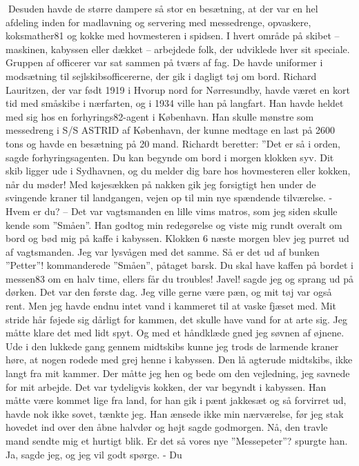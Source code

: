 Desuden havde de større dampere så stor en besætning, at der var en hel
afdeling inden for madlavning og servering med messedrenge, opvaskere,
koksmather81 og kokke med hovmesteren i spidsen. I hvert område på
skibet -- maskinen, kabyssen eller dækket -- arbejdede folk, der
udviklede hver sit speciale. Gruppen af officerer var sat sammen på
tværs af fag. De havde uniformer i modsætning til sejlskibsofficererne,
der gik i dagligt tøj om bord. Richard Lauritzen, der var født 1919 i
Hvorup nord for Nørresundby, havde været en kort tid med småskibe i
nærfarten, og i 1934 ville han på langfart. Han havde heldet med sig hos
en forhyrings82-agent i København. Han skulle mønstre som messedreng i
S/S ASTRID af København, der kunne medtage en last på 2600 tons og havde
en besætning på 20 mand. Richardt beretter: ''Det er så i orden, sagde
forhyringsagenten. Du kan begynde om bord i morgen klokken syv. Dit skib
ligger ude i Sydhavnen, og du melder dig bare hos hovmesteren eller
kokken, når du møder! Med køjesækken på nakken gik jeg forsigtigt hen
under de svingende kraner til landgangen, vejen op til min nye spændende
tilværelse. - Hvem er du? -- Det var vagtsmanden en lille vims matros,
som jeg siden skulle kende som ''Småen''. Han godtog min redegørelse og
viste mig rundt overalt om bord og bød mig på kaffe i kabyssen. Klokken
6 næste morgen blev jeg purret ud af vagtsmanden. Jeg var lysvågen med
det samme. Så er det ud af bunken ''Petter''! kommanderede ''Småen'',
påtaget barsk. Du skal have kaffen på bordet i messen83 om en halv time,
ellers får du troubles! Javel! sagde jeg og sprang ud på dørken. Det var
den første dag. Jeg ville gerne være pæn, og mit tøj var også rent. Men
jeg havde endnu intet vand i kammeret til at vaske fjæset med. Mit
stride hår føjede sig dårligt for kammen, det skulle have vand for at
arte sig. Jeg måtte klare det med lidt spyt. Og med et håndklæde gned
jeg søvnen af øjnene. Ude i den lukkede gang gennem midtskibs kunne jeg
trods de larmende kraner høre, at nogen rodede med grej henne i
kabyssen. Den lå agterude midtskibs, ikke langt fra mit kammer. Der
måtte jeg hen og bede om den vejledning, jeg savnede for mit arbejde.
Det var tydeligvis kokken, der var begyndt i kabyssen. Han måtte være
kommet lige fra land, for han gik i pænt jakkesæt og så forvirret ud,
havde nok ikke sovet, tænkte jeg. Han ænsede ikke min nærværelse, før
jeg stak hovedet ind over den åbne halvdør og højt sagde godmorgen. Nå,
den travle mand sendte mig et hurtigt blik. Er det så vores nye
''Messepeter''? spurgte han. Ja, sagde jeg, og jeg vil godt spørge. - Du
